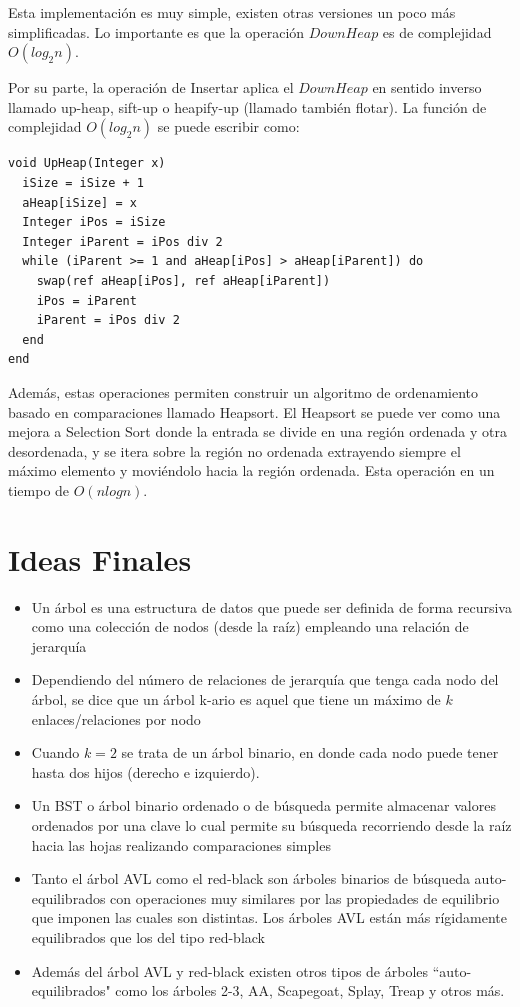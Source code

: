 Esta implementación es muy simple, existen otras versiones un poco más simplificadas. Lo importante es que la operación $DownHeap$ es de complejidad $O(log_2n)$.

Por su parte, la operación de Insertar aplica el $DownHeap$ en sentido inverso llamado up-heap, sift-up o heapify-up (llamado también flotar). La función de complejidad $O(log_2n)$ se puede escribir como:

\begin{lstlisting}[upquote=true, language=pseudo]
void UpHeap(Integer x)
  iSize = iSize + 1
  aHeap[iSize] = x
  Integer iPos = iSize
  Integer iParent = iPos div 2
  while (iParent >= 1 and aHeap[iPos] > aHeap[iParent]) do
    swap(ref aHeap[iPos], ref aHeap[iParent])
	iPos = iParent
    iParent = iPos div 2
  end  
end
\end{lstlisting}

Además, estas operaciones permiten construir un algoritmo de ordenamiento basado en comparaciones llamado Heapsort. El Heapsort se puede ver como una mejora a Selection Sort donde la entrada se divide en una región ordenada y otra desordenada, y se itera sobre la región no ordenada extrayendo siempre el máximo elemento y moviéndolo hacia la región ordenada. Esta operación en un tiempo de $O(nlogn)$.

\section{Ideas Finales}

\begin{itemize}
\item Un árbol es una estructura de datos que puede ser definida de forma recursiva como una colección de nodos (desde la raíz) empleando una relación de jerarquía
\item Dependiendo del número de relaciones de jerarquía que tenga cada nodo del árbol, se dice que un árbol k-ario es aquel que tiene un máximo de $k$ enlaces/relaciones por nodo
\item Cuando $k=2$ se trata de un árbol binario, en donde cada nodo puede tener hasta dos hijos (derecho e izquierdo).
\item Un BST o árbol binario ordenado o de búsqueda permite almacenar valores ordenados por una clave lo cual permite su búsqueda recorriendo desde la raíz hacia las hojas realizando comparaciones simples
\item Tanto el árbol AVL como el red-black son árboles binarios de búsqueda auto-equilibrados con operaciones muy similares por las propiedades de equilibrio que imponen las cuales son distintas. Los árboles AVL están más rígidamente equilibrados que los del tipo red-black
\item Además del árbol AVL y red-black existen otros tipos de árboles ``auto-equilibrados" como los árboles 2-3, AA, Scapegoat, Splay, Treap y otros más.
\end{itemize}

